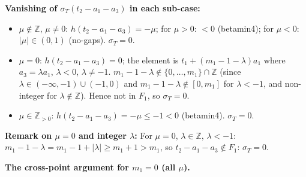 \documentclass{article}
\begin{document}
\noindent\textbf{Vanishing of $\sigma_T(t_2-a_1-a_3)$ in each sub-case:}
\begin{itemize}
\item $\mu\notin\mathbb{Z}$, $\mu\ne 0$: $h(t_2-a_1-a_3)=-\mu$; for $\mu>0$: $<0$ (betamin4); for $\mu<0$: $|\mu|\in(0,1)$ (no-gaps). $\sigma_T=0$. \checkmark
\item $\mu=0$: $h(t_2-a_1-a_3)=0$; the element is $t_1+(m_1-1-\lambda)a_1$ where $a_3=\lambda a_1$, $\lambda<0$, $\lambda\ne-1$. $m_1-1-\lambda\notin\{0,\dots,m_1\}\cap\mathbb{Z}$ (since $\lambda\in(-\infty,-1)\cup(-1,0)$ and $m_1-1-\lambda\notin[0,m_1]$ for $\lambda<-1$, and non-integer for $\lambda\notin\mathbb{Z}$). Hence not in $F_1$, so $\sigma_T=0$. \checkmark
\item $\mu\in\mathbb{Z}_{>0}$: $h(t_2-a_1-a_3)=-\mu\le-1<0$ (betamin4). $\sigma_T=0$. \checkmark
\end{itemize}

\noindent\textbf{Remark on $\mu=0$ and integer $\lambda$:}
For $\mu=0$, $\lambda\in\mathbb{Z}$, $\lambda<-1$: $m_1-1-\lambda=m_1-1+|\lambda|\ge m_1+1>m_1$,
so $t_2-a_1-a_3\notin F_1$: $\sigma_T=0$. \checkmark

\medskip
\noindent\textbf{The cross-point argument for $m_1=0$ (all $\mu$).}
\end{document}
